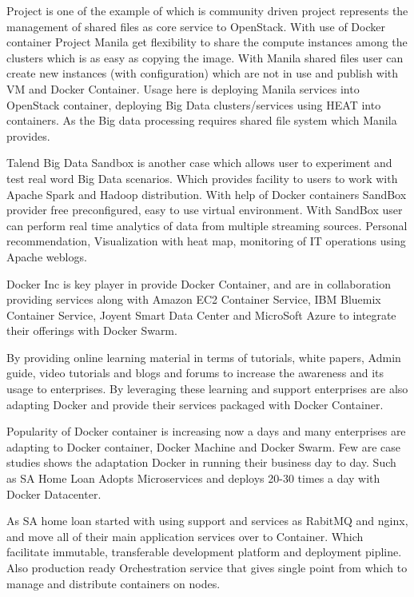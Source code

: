 \documentclass[9pt,twocolumn,twoside]{styles/osajnl}
\newcommand{\TODO}[2][]{\todo[color=red!10,inline,#1]{#2}}
\newcommand{\GE}{\TODO{Grammar}}
\begin{document}
Project is one of the example of which is community driven project represents the management of shared files as core service to OpenStack. With use of Docker container Project Manila get flexibility to share the compute instances among the clusters which is as easy as copying the image. With Manila shared files user can create new instances (with configuration) which are not in use and publish with VM and Docker Container. Usage here is deploying Manila services into OpenStack container, deploying Big Data clusters/services using HEAT into containers. As the Big data processing requires shared file system which Manila provides.\cite{Manila}

Talend Big Data Sandbox is another case which allows user to experiment and test real word Big Data scenarios. Which provides facility to users to work with Apache Spark and Hadoop distribution. With help of Docker containers SandBox provider free preconfigured, easy to use virtual environment. With SandBox user can perform real time analytics of data from multiple streaming sources. Personal recommendation, Visualization with heat map, monitoring of IT operations using Apache weblogs.\cite{SandBox}
\TODO{
 \GE Unnecessary comma usage. 
}

Docker Inc is key player in provide Docker Container, and are in collaboration providing services along with Amazon EC2 Container Service, IBM Bluemix Container Service, Joyent Smart Data Center and MicroSoft Azure to integrate their offerings with Docker Swarm.

By providing online learning material in terms of tutorials, white papers, Admin guide, video tutorials and blogs and forums to increase the awareness and its usage to enterprises. By leveraging these learning and support enterprises are also adapting Docker and provide their services packaged with Docker Container. 

Popularity of Docker container is increasing now a days and many enterprises are adapting to Docker container, Docker Machine and Docker Swarm. Few are case studies shows the adaptation Docker in running their business day to day. Such as SA Home Loan Adopts Microservices and deploys 20-30 times a day with Docker Datacenter.

As SA home loan started with using support and services as RabitMQ and nginx, and move all of their main application services over to Container. Which facilitate immutable, transferable development platform and deployment pipline. Also production ready Orchestration service that gives single point from which to manage and distribute containers on nodes.
\end{document}
